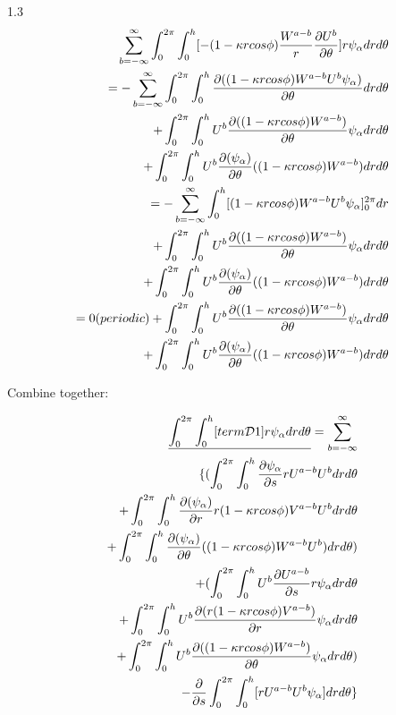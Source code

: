 \documentclass{Note}
\begin{document}
1.3
\begin{equation}
\begin{aligned}
\sum_{b=-\infty}^{\infty}\int_0^{2\pi} \int_0^h  [-(1-\kappa rcos\phi){W^{a-b}\over r}{{\partial U^b}\over {\partial \theta}}]  r \psi_\alpha dr d\theta\\
=-\sum_{b=-\infty}^{\infty} \int_0^{2\pi} \int_0^h {\partial ((1-\kappa rcos\phi)W^{a-b}U^b \psi_\alpha )\over\partial \theta}dr d\theta \\
+\int_0^{2\pi} \int_0^h U^b{ \partial ((1-\kappa rcos\phi)W^{a-b})\over\partial \theta}\psi_\alpha dr d\theta \\
+\int_0^{2\pi} \int_0^h U^b{ \partial (\psi_\alpha) \over\partial \theta} ((1-\kappa rcos\phi)W^{a-b})dr d\theta \\
=-\sum_{b=-\infty}^{\infty} \int_0^{h} [ (1-\kappa rcos\phi)W^{a-b}U^b\psi_\alpha ]_0^{2\pi}  dr \\
+\int_0^{2\pi} \int_0^h U^b{ \partial ((1-\kappa rcos\phi)W^{a-b})\over\partial \theta}\psi_\alpha dr d\theta \\
+\int_0^{2\pi} \int_0^h U^b{ \partial (\psi_\alpha) \over\partial \theta} ((1-\kappa rcos\phi)W^{a-b})dr d\theta \\
=0(periodic)+\int_0^{2\pi} \int_0^h U^b{ \partial ((1-\kappa rcos\phi)W^{a-b})\over\partial \theta}\psi_\alpha dr d\theta\\
+\int_0^{2\pi} \int_0^h U^b{ \partial (\psi_\alpha) \over\partial \theta} ((1-\kappa rcos\phi)W^{a-b})dr d\theta \\
\end{aligned}
\end{equation}

Combine together:

\begin{equation}
\begin{aligned}
\underline{\int_0^{2\pi} \int_0^h  [term\mathcal{D}1]  r \psi_\alpha dr d\theta}=\sum_{b=-\infty}^{\infty}\\
\{ (\int_0^{2\pi}\int_0^h   {{\partial \psi_\alpha}\over {\partial s}}{r U^{a-b}U^b} dr d\theta \\
+\int_0^{2\pi} \int_0^h { \partial (\psi_\alpha)\over\partial r} r(1-\kappa rcos\phi)V^{a-b}U^b dr d\theta \\
+\int_0^{2\pi} \int_0^h { \partial (\psi_\alpha) \over\partial \theta} ((1-\kappa rcos\phi)W^{a-b}U^b)dr d\theta )\\
+(\int_0^{2\pi}\int_0^h  U^b {{\partial U^{a-b}}\over {\partial s}} r\psi_\alpha dr d\theta \\
+\int_0^{2\pi} \int_0^h U^b{ \partial (r(1-\kappa rcos\phi)V^{a-b})\over\partial r}\psi_\alpha dr d\theta \\
+\int_0^{2\pi} \int_0^h U^b{ \partial ((1-\kappa rcos\phi)W^{a-b})\over\partial \theta}\psi_\alpha dr d\theta)\\
-{{\partial }\over {\partial s}}\int_0^{2\pi}\int_0^h   [ {r U^{a-b}} U^b\psi_\alpha] dr d\theta \}
\end{aligned}
\end{equation}
\end{document}
